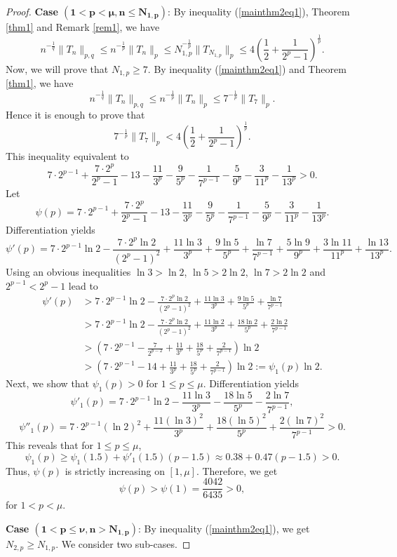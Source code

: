 \documentclass{amsart}
\begin{document}
\begin{proof}
{\bf Case $\boldsymbol{(1< p< \mu, n\leq N_{1,p})}$}: By inequality (\ref{mainthm2eq1}), Theorem \ref{thm1} and Remark \ref{rem1}, we have
 $$n^{-\frac{1}{q}}\|T_n\|_{p,q}\leq n^{-\frac{1}{p}}\|T_n\|_{p}\leq N_{1,p}^{-\frac{1}{p}}\|T_{N_{1,p}}\|_{p}\leq4\left(\frac{1}{2}+\frac{1}{2^p-1}\right)^{\frac{1}{p}}.$$ 
Now, we will prove that $N_{1,p}\geq7$. By inequality (\ref{mainthm2eq1}) and Theorem \ref{thm1}, we have
$$n^{-\frac{1}{q}}\|T_n\|_{p,q}\leq n^{-\frac{1}{p}}\|T_n\|_{p}\leq7^{-\frac{1}{p}}\|T_7\|_{p}.$$
Hence it is enough to prove that
$$7^{-\frac{1}{p}}\|T_7\|_{p}<4\left(\frac{1}{2}+\frac{1}{2^p-1}\right)^{\frac{1}{p}}.$$
This inequality equivalent to
$$7\cdot 2^{p-1}+\frac{7\cdot 2^p}{2^p-1}-13-\frac{11}{3^p}-\frac{9}{5^p}-\frac{1}{7^{p-1}}-\frac{5}{9^p}-\frac{3}{11^p}-\frac{1}{13^p}>0.$$
Let 
$$\psi(p)=7\cdot 2^{p-1}+\frac{7\cdot 2^p}{2^p-1}-13-\frac{11}{3^p}-\frac{9}{5^p}-\frac{1}{7^{p-1}}-\frac{5}{9^p}-\frac{3}{11^p}-\frac{1}{13^p}.$$
Differentiation yields
$$\psi'(p)=7\cdot 2^{p-1}\ln 2-\frac{7\cdot 2^p\ln2}{(2^p-1)^2}+\frac{11\ln3}{3^p}+\frac{9\ln5}{5^p}+\frac{\ln7}{7^{p-1}}+\frac{5\ln9}{9^p}+\frac{3\ln11}{11^p}+\frac{\ln13}{13^p}.$$
Using an obvious inequalities $\ln3>\ln2$, $\ln 5>2\ln2$, $\ln 7>2\ln2$ and $2^{p-1}<2^p-1$ lead to
\begin{align*}
\psi'(p)&>7\cdot 2^{p-1}\ln 2-\frac{7\cdot 2^p\ln2}{(2^p-1)^2}+\frac{11\ln3}{3^p}+\frac{9\ln5}{5^p}+\frac{\ln7}{7^{p-1}}\\
&>7\cdot 2^{p-1}\ln 2-\frac{7\cdot 2^p\ln2}{(2^p-1)^2}+\frac{11\ln2}{3^p}+\frac{18\ln2}{5^p}+\frac{2\ln2}{7^{p-1}}\\
&>\left(7\cdot 2^{p-1}-\frac{7}{2^{p-2}}+\frac{11}{3^p}+\frac{18}{5^p}+\frac{2}{7^{p-1}}\right)\ln2\\
&>\left(7\cdot 2^{p-1}-14+\frac{11}{3^p}+\frac{18}{5^p}+\frac{2}{7^{p-1}}\right)\ln2:=\psi_1(p)\ln2.
\end{align*}
Next, we show that $\psi_1(p)>0$ for $1\leq p\leq \mu$. Differentiation yields
$$\psi'_1(p)=7\cdot 2^{p-1}\ln2-\frac{11\ln3}{3^p}-\frac{18\ln5}{5^p}-\frac{2\ln7}{7^{p-1}},$$
$$\psi''_1(p)=7\cdot 2^{p-1}(\ln2)^2+\frac{11(\ln3)^2}{3^p}+\frac{18(\ln5)^2}{5^p}+\frac{2(\ln7)^2}{7^{p-1}}>0.$$
This reveals that for $1\leq p\leq \mu$,
$$\psi_1(p)\geq \psi_1(1.5)+\psi'_1(1.5)(p-1.5)\approx 0.38+0.47(p-1.5)>0.$$
Thus, $\psi(p)$ is strictly increasing on $[1,\mu]$. Therefore, we get
$$\psi(p)>\psi(1)=\frac{4042}{6435}>0,$$
 for $1< p< \mu$.

{\bf Case $\boldsymbol{(1< p\leq \nu, n>N_{1,p})}$}: By inequality (\ref{mainthm2eq1}), we get $N_{2, p}\geq N_{1,p}$. We consider two sub-cases.


\end{proof}
\end{document}
